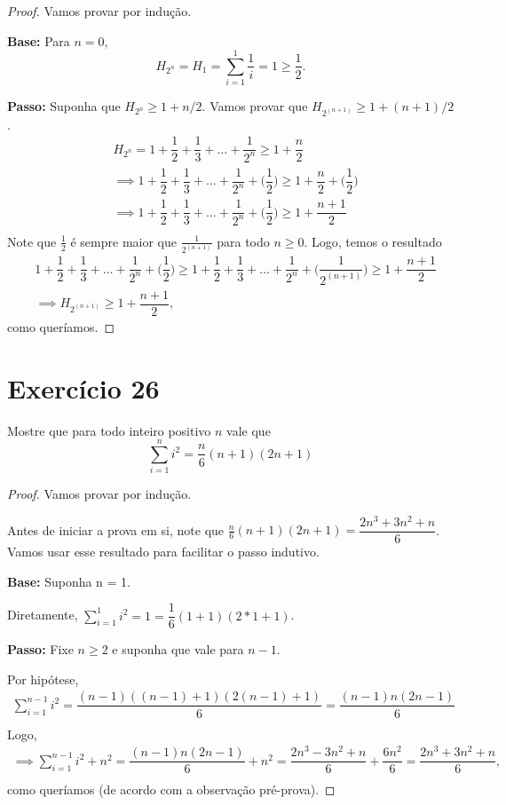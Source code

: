 \documentclass{article}
\begin{document}
\begin{proof}
Vamos provar por indução.

\textbf{Base: } Para $n=0$,
\[ H_{2^n} = H_1 = \sum_ {i=1}^{1} \dfrac{1}{i} = 1 \geq \dfrac{1}{2} . \]

\textbf{Passo: } Suponha que $H_{2^n} \geq 1 + n/2$. Vamos provar que $H_{2^{(n+1)}} \geq 1 + (n+1)/2$.
\begin{align*}
&H_{2^n} = 1 + \dfrac{1}{2} + \dfrac{1}{3} + \dots + \dfrac{1}{2^n} \geq 1 + \dfrac{n}{2} \\
&\implies 1 + \dfrac{1}{2} + \dfrac{1}{3} + \dots + \dfrac{1}{2^n} + \Big(\dfrac{1}{2}\Big) \geq 1 + \dfrac{n}{2} + \Big(\dfrac{1}{2}\Big) \\
&\implies 1 + \dfrac{1}{2} + \dfrac{1}{3} + \dots + \dfrac{1}{2^n} + \Big(\dfrac{1}{2}\Big) \geq 1 + \dfrac{n+1}{2} \\
\end{align*}
Note que $\frac{1}{2}$ é sempre maior que $\frac{1}{2^{(n+1)}}$ para todo $n \geq 0$.
Logo, temos o resultado
\begin{align*}
    &1 + \dfrac{1}{2} + \dfrac{1}{3} + \dots + \dfrac{1}{2^n} + \Big(\dfrac{1}{2}\Big) \geq 1 + \dfrac{1}{2} + \dfrac{1}{3} + \dots + \dfrac{1}{2^n} + \Big(\dfrac{1}{2^{(n+1)}}\Big) \geq 1 + \dfrac{n+1}{2} \\
    &\implies H_{2^{(n+1)}} \geq  1 + \dfrac{n+1}{2} ,
\end{align*}
como queríamos.
\end{proof}

\section*{Exercício 26}
Mostre que para todo inteiro positivo $n$ vale que \[ \sum_{i=1}^{n}i^2 = \dfrac{n}{6} (n+1) (2n+1) \]
\begin{proof}
Vamos provar por indução.

Antes de iniciar a prova em si, note que $\frac{n}{6}(n+1)(2n+1) = \dfrac{2n^3 + 3n^2 + n}{6}$.
Vamos usar esse resultado para facilitar o passo indutivo.

\textbf{Base: }Suponha n = 1.

Diretamente, $\sum_{i=1}^{1}i^2 = 1 = \dfrac{1}{6} (1+1) (2*1+1)$.

\textbf{Passo: }Fixe $n \geq 2$ e suponha que vale para $n-1$.

Por hipótese,
\begin{align*}
    \sum_{i=1}^{n-1}i^2 = \dfrac{(n-1)((n-1)+1) (2(n-1)+1)}{6}  = \dfrac{(n-1)n(2n-1)}{6} \\
\end{align*}
Logo,
\begin{align*}
    \implies \sum_{i=1}^{n-1}i^2 + n^2 = \dfrac{(n-1)n(2n-1)}{6} + n^2 = \dfrac{2n^3 - 3n^2 + n}{6} + \dfrac{6n^2}{6} = \dfrac{2n^3 + 3n^2 + n}{6} , \\
\end{align*}
como queríamos (de acordo com a observação pré-prova).

\end{proof}
\end{document}
